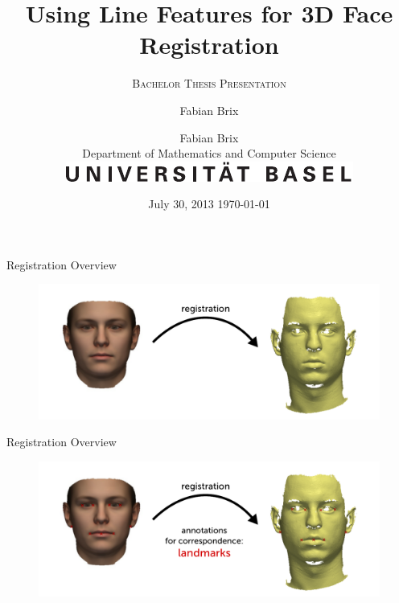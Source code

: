 \documentclass[xcolor=x11names,compress]{beamer}
\author{Fabian Brix}
\date{July 30, 2013}
\begin{document}

\begin{frame}
    \vspace*{\fill}
    \title[Bachelor Thesis]{Using Line Features for 3D Face Registration}
\subtitle{\scshape Bachelor Thesis Presentation}
    \author{Fabian Brix\\
        \bigskip
        Department of Mathematics and Computer Science\\
        \includegraphics[width=.4\textwidth]{../resources/img/LogoUniBasel.pdf}}
        \date{
            \today
        }
        \titlepage
    \vspace*{\fill}
    \end{frame}

    \begin{frame}{Registration Overview}
        \begin{figure}
            \includegraphics[width=\textwidth]{../resources/figures/intro1.pdf}
        \end{figure}
    \end{frame}

    \begin{frame}{Registration Overview}
        \begin{figure}
            \includegraphics[width=\textwidth]{../resources/figures/intro2.pdf}
        \end{figure}
    \end{frame}
\end{document}
